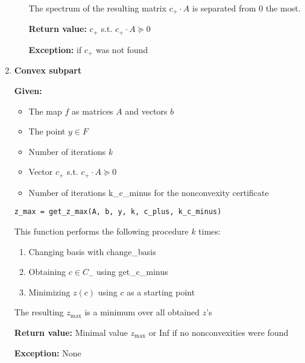 \documentclass[a4paper]{article}
\theoremstyle{definition}
\begin{document}
\begin{enumerate}
\begin{enumerate}
The spectrum of the resulting matrix $c_+\cdot A$ is separated from $0$ the most.
	
	{\bf Return value:} $c_+$ s.t. $c_+\cdot A\succeq 0$
	
	{\bf Exception:} if $c_+$ was not found
\end{enumerate}

\item {\bf Convex subpart}

{\bf Given:}
\begin{itemize}
	\item The map $f$ as matrices $A$ and vectors $b$
	\item The point $y\in F$
	\item Number of iterations $k$
	\item Vector $c_+$ s.t. $c_+\cdot A\succeq 0$
	\item Number of iterations k\_c\_minus for the nonconvexity certificate
\end{itemize}
\begin{verbatim}
z_max = get_z_max(A, b, y, k, c_plus, k_c_minus)
\end{verbatim}
This function performs the following procedure $k$ times:
\begin{enumerate}
\item Changing basis with change\_basis
\item Obtaining $c\in C_-$ using get\_c\_minus
\item Minimizing $z(c)$ using $c$ as a starting point
\end{enumerate}

The resulting $z_{\max}$ is a minimum over all obtained $z$'s

{\bf Return value:} Minimal value $z_{\max}$ or Inf if no nonconvexities were found

{\bf Exception:} None
\end{enumerate}
\end{document}

